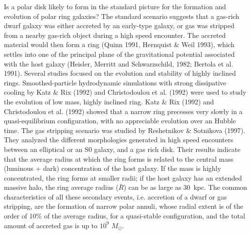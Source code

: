 \documentclass[preprint]{aastex}
\begin{document}
Is a polar disk likely to form in the standard picture
for the formation and evolution of polar ring galaxies?
The standard scenario suggests that a 
gas-rich dwarf galaxy was either accreted
by an early-type galaxy, or gas was stripped from a nearby
gas-rich object during a high speed encounter.  
The accreted material would then form a ring
(Quinn 1991, Hernquist \& Weil 1993), which settles into
one of the principal plane of the gravitational potential associated
with the host galaxy (Heisler, Merritt and Schwarzschild, 1982; 
Bertola et al. 1991).
Several studies focused on the evolution and stability of
highly inclined rings.  Smoothed-particle hydrodynamic simulations 
with strong dissipative cooling by Katz \& Rix (1992) and 
Christodoulou et al. (1992) 
were used to study the evolution of low mass, highly inclined ring.
Katz \& Rix (1992) and Christodoulou et al. (1992) showed
that a narrow ring precesses very slowly in a
quasi-equilibrium configuration, with no appreciable evolution over an
Hubble time.
The gas stripping scenario was studied by Reshetnikov \& Sotnikova (1997).
They analyzed the different morphologies generated
in high speed encounters between an elliptical or an S0 galaxy, and a gas
rich disk.  Their results indicate that the average radius
at which the ring forms is related to the central mass (luminous +
dark) concentration of the host galaxy.  If the mass is highly
concentrated, the ring forms at smaller radii; if the host galaxy
has an extended massive halo, the ring average radius ($\bar{R}$) can
be as large as 30~kpc.
The common characteristics of all these secondary events, 
i.e. accretion of a dwarf or gas stripping, are the formation 
of narrow polar annuli, whose radial extent is of the order of 10\% 
of the average radius, for a quasi-stable configuration, 
and the total amount of accreted gas is up to $10^{9}$ $M_{\odot}$. 
\end{document}
